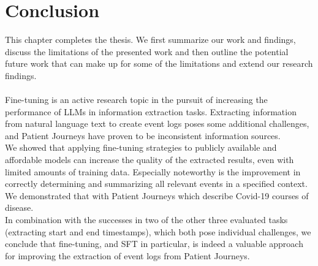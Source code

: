 \section{Conclusion}\label{sec:conclusion}
This chapter completes the thesis. We first summarize our work and findings, discuss the limitations of the presented work and then outline the potential future work that can make up for some of the limitations and extend our research findings.\\\\
Fine-tuning is an active research topic in the pursuit of increasing the performance of LLMs in information extraction tasks. Extracting information from natural language text to create event logs poses some additional challenges, and Patient Journeys have proven to be inconsistent information sources.\\
We showed that applying fine-tuning strategies to publicly available and affordable models can increase the quality of the extracted results, even with limited amounts of training data. Especially noteworthy is the improvement in correctly determining and summarizing all relevant events in a specified context. We demonstrated that with Patient Journeys which describe Covid-19 courses of disease.\\
In combination with the successes in two of the other three evaluated tasks (extracting start and end timestamps), which both pose individual challenges, we conclude that fine-tuning, and SFT in particular, is indeed a valuable approach for improving the extraction of event logs from Patient Journeys.

